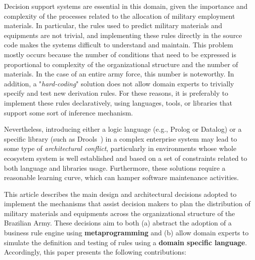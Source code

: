 Decision support systems are essential in this domain, given the importance and complexity of the processes related to the allocation of military employment materials. In particular, the rules used to predict military materials and equipments are not trivial, and implementing these rules directly in the source code makes the systems difficult to understand and maintain. This problem mostly occurs because the number of conditions that need to be expressed is proportional to complexity of the organizational structure and the number of materials. In the case of an entire army force, this number is noteworthy. In addition, a "\emph{hard-coding}" solution does not allow domain experts to trivially specify and test new derivation rules. For these reasons, it is preferably to implement these rules declaratively, using languages, tools, or libraries that support some sort of inference mechanism.


Nevertheless, introducing either a logic language (e.g., Prolog or Datalog) or a specific library (such as  Drools~\cite{browne2009}) in a complex enterprise system may lead to some type of \emph{architectural 
conflict}, particularly in environments whose whole ecosystem system is well established and based on a set of 
constraints related to both language and libraries usage. Furthermore, these solutions require a reasonable learning curve, which can hamper software maintenance activities.


This article describes the main design and architectural decisions adopted to implement the mechanisms that assist 
decision makers to plan the distribution of military materials and equipments across the organizational structure 
of the Brazilian Army. These decisions aim to both (a) abstract the adoption of a business rule engine using {\bf metaprogramming} 
and (b) allow domain experts to simulate the definition and testing of rules using 
a {\bf domain specific language}. Accordingly, this paper presents the following contributions:

